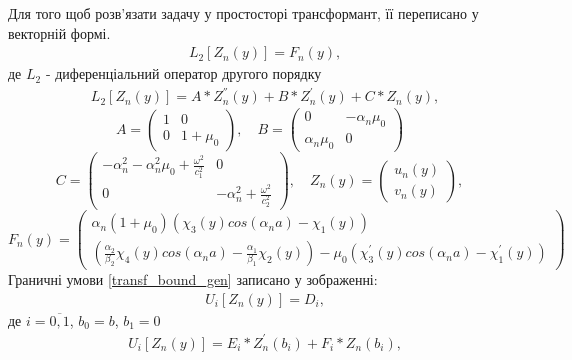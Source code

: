 Для того щоб розв'язати задачу у простосторі трансформант, її переписано у векторній формі.
\begin{align}\label{transf_mat_gen}
    &L_2\left[ Z_n(y) \right] = F_n(y),
\end{align}
де $L_2$ - диференціальний оператор другого порядку
\begin{align}
    &L_2\left[ Z_n(y) \right] = A * Z_n^{''}(y) + B * Z_n^{'}(y) + C * Z_n(y), 
\end{align}
\begin{equation*}
    A = \begin{pmatrix}
        1 & 0 \\
        0 & 1 + \mu_0
    \end{pmatrix}, \quad
    B = \begin{pmatrix}
        0 & -\alpha_n \mu_0 \\
        \alpha_n \mu_0 & 0
    \end{pmatrix}
\end{equation*}
\begin{equation*}
    C = \begin{pmatrix}
        -\alpha_n^2 -\alpha_n^2 \mu_0 + \frac{\omega^2}{c_1^2} & 0 \\
        0 & -\alpha_n^2 + \frac{\omega^2}{c_2^2}
    \end{pmatrix}, \quad
    Z_n(y) = \begin{pmatrix}
        u_n(y) \\
        v_n(y)
    \end{pmatrix},
\end{equation*}
\begin{equation*}
    F_n(y) = \begin{pmatrix}
        \alpha_n(1 + \mu_0)(\chi_3(y) cos(\alpha_n a) - \chi_1(y)) \\
        (\frac{\alpha_2}{\beta_2}\chi_4(y) cos(\alpha_n a) - \frac{\alpha_1}{\beta_1}\chi_2(y)) - \mu_0 (\chi_3^{'}(y) cos(\alpha_n a) -\chi_1^{'}(y))
    \end{pmatrix}
\end{equation*}
Граничні умови \eqref{transf_bound_gen} записано у зображенні:
\begin{align}\label{transf_bound_mat_gen}
    &U_i\left[ Z_n(y) \right] = D_i,
\end{align}
де $i = \overline{0, 1}$, $b_0 = b$, $b_1 = 0$
\begin{align}
    &U_i\left[ Z_n(y) \right] = E_i * Z_n^{'}(b_i) + F_i * Z_n(b_i),
\end{align}
